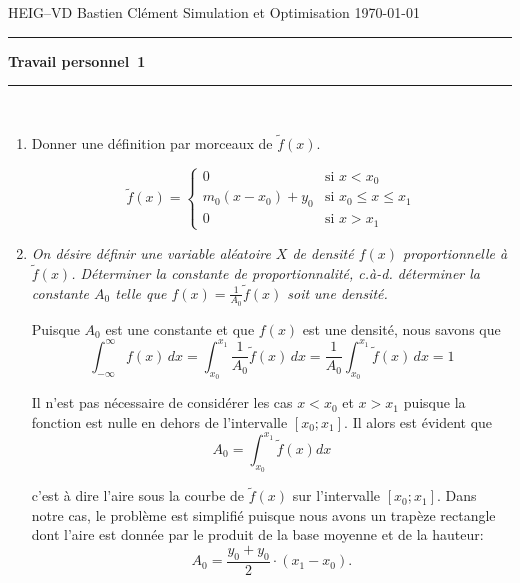 \documentclass[a4paper,11pt]{report}
\newcounter{numero}
\newcommand{\exo}{{\Large \vspace*{2mm}\addtocounter{numero}{1}{\bf Problème~\thenumero}\\[2mm]}}
\begin{document}
	
{\sc HEIG--VD} \hfill Bastien Clément\newline 
Simulation et Optimisation \hfill \today \newline
\hrule
\vspace{7mm}
 \hfill {\large \bf Travail personnel~1}\\[3mm]
\hrule
\vspace{7mm}

\exo
\begin{enumerate}[\indent a)]\itemsep3mm
	
\item Donner une définition par morceaux de $\tilde{f}(x)$.

\begin{equation*}
\tilde{f}(x) = \left\lbrace \begin{array}{ll}
	0						& \text{si $x < x_0$} \\
	m_0 ( x - x_0 ) + y_0	& \text{si $x_0 \leq x \leq x_1$} \\
	0 						& \text{si $x > x_1$}
\end{array} \right.
\end{equation*}

\item {\em On désire définir une variable aléatoire $X$ de densité $f(x)$ proportionnelle à $\tilde{f}(x)$. Déterminer la constante de proportionnalité, c.à-d. déterminer la constante $A_{0}$ telle que $f(x) = \frac{1}{A_{0}}\tilde{f}(x)$ soit une densité.}

Puisque $A_{0}$ est une constante et que $f(x)$ est une densité, nous savons que
\begin{equation*}
	\int_{-\infty}^{\infty} f(x)\,dx =
	\int_{x_0}^{x_1} \frac{1}{A_0} \tilde{f}(x)\,dx =
	\frac{1}{A_0} \int_{x_0}^{x_1} \tilde{f}(x)\,dx = 1
\end{equation*}

Il n'est pas nécessaire de considérer les cas $x < x_0$ et $x > x_1$ puisque la fonction est nulle en dehors de l'intervalle $[x_0; x_1]$. Il alors est évident que
\begin{equation*}
	A_0 = \int_{x_0}^{x_1} \tilde{f}(x)dx
\end{equation*}

c'est à dire l'aire sous la courbe de $\tilde{f}(x)$ sur l'intervalle $[x_0; x_1]$. Dans notre cas, le problème est simplifié puisque nous avons un trapèze rectangle dont l'aire est donnée par le produit de la base moyenne et de la hauteur:
\begin{equation*}
	A_0 = \frac{y_0 + y_0}{2} \cdot (x_1 - x_0).
\end{equation*}


\end{enumerate}
\end{document}
